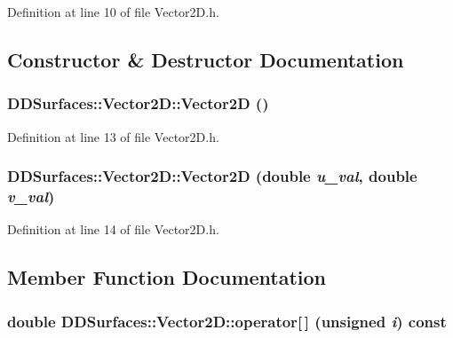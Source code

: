 Definition at line 10 of file Vector2D.h.

\subsection{Constructor \& Destructor Documentation}
\hypertarget{class_d_d_surfaces_1_1_vector2_d_a779bdb4c9b38f3b1c04d8cc56ef78efd}{
\subsubsection[{Vector2D}]{\setlength{\rightskip}{0pt plus 5cm}DDSurfaces::Vector2D::Vector2D ()}}
\label{class_d_d_surfaces_1_1_vector2_d_a779bdb4c9b38f3b1c04d8cc56ef78efd}


Definition at line 13 of file Vector2D.h.\hypertarget{class_d_d_surfaces_1_1_vector2_d_ab41635e717c46f012b11db18f72d145c}{
\subsubsection[{Vector2D}]{\setlength{\rightskip}{0pt plus 5cm}DDSurfaces::Vector2D::Vector2D (double {\em u\_\-val}, \/  double {\em v\_\-val})}}
\label{class_d_d_surfaces_1_1_vector2_d_ab41635e717c46f012b11db18f72d145c}


Definition at line 14 of file Vector2D.h.

\subsection{Member Function Documentation}
\hypertarget{class_d_d_surfaces_1_1_vector2_d_aa7b742f23e71d50c890592e392897f41}{
\subsubsection[{operator[]}]{\setlength{\rightskip}{0pt plus 5cm}double DDSurfaces::Vector2D::operator\mbox{[}$\,$\mbox{]} (unsigned {\em i}) const}}
\label{class_d_d_surfaces_1_1_vector2_d_aa7b742f23e71d50c890592e392897f41}



